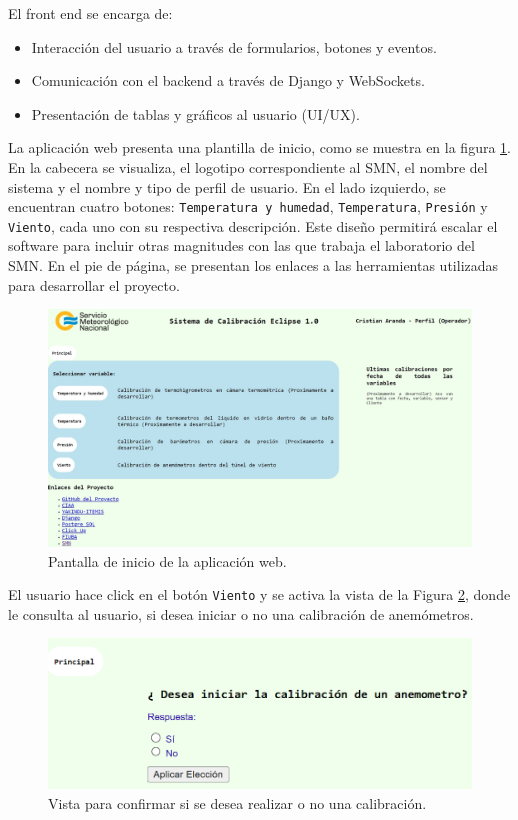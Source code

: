 El front end se encarga de:
\begin{itemize}
    \item Interacción del usuario a través de formularios, botones y eventos.
    \item Comunicación con el backend a través de Django y WebSockets.
    \item Presentación de tablas y gráficos al usuario (UI/UX).
\end{itemize}
La aplicación web presenta una plantilla de inicio, como se muestra en la figura \ref{fig:index}. En la cabecera se visualiza, el logotipo correspondiente al SMN, el nombre del sistema y el nombre y tipo de perfil de usuario. En el lado izquierdo, se encuentran cuatro botones: \texttt{Temperatura y humedad}, \texttt{Temperatura}, \texttt{Presión} y \texttt{Viento}, cada uno con su respectiva descripción. Este diseño permitirá escalar el software para incluir otras magnitudes con las que trabaja el laboratorio del SMN. En el pie de página, se presentan los enlaces a las herramientas utilizadas para desarrollar el proyecto.
\begin{figure}[H]
    \centering
    \includegraphics[width=1.1\linewidth]{Figuras/AplicacionWeb/frondend/index.jpg}
    \caption{Pantalla de inicio de la aplicación web.}
    \label{fig:index}
\end{figure}
El usuario hace click en el botón \texttt{Viento} y se activa la vista de la Figura \ref{fig:iniciarCalibViento}, donde le consulta al usuario, si desea iniciar o no una calibración de anemómetros.
\begin{figure}[H]
    \centering
    \includegraphics[width=0.8\linewidth]{Figuras/AplicacionWeb/frondend/iniciarCalibViento.png}
    \caption{Vista para confirmar si se desea realizar o no una calibración.}
    \label{fig:iniciarCalibViento}
\end{figure}
